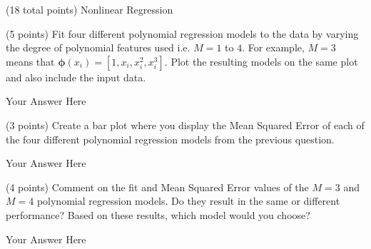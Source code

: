 \documentclass[12pt]{article}
\begin{document}
\begin{question}{(18 total points) Nonlinear Regression}





%
%
\begin{subquestion}{(5 points) Fit four different polynomial regression models to the data  by varying the degree of polynomial features used i.e. $M = 1$ to $4$.
For example, $M=3$ means that $\boldsymbol{\phi}(x_i) = [1, x_i, x_i^2, x_i^3]$.
Plot the resulting models on the same plot and also include the input data.\\
}


\begin{answerbox}{35em}
Your Answer Here
\end{answerbox}



\end{subquestion}


%
%
\begin{subquestion}{(3 points) Create a bar plot where you display the Mean Squared Error of each of the four different polynomial regression models from the previous question.}


\begin{answerbox}{35em}
Your Answer Here
\end{answerbox}



\end{subquestion}


%
%
\begin{subquestion}{(4 points) Comment on the fit and Mean Squared Error values of the $M=3$ and $M=4$ polynomial regression models. 
Do they result in the same or different performance? 
Based on these results, which model would you choose?}


\begin{answerbox}{15em}
Your Answer Here
\end{answerbox}




\end{subquestion}
\end{question}
\end{document}
